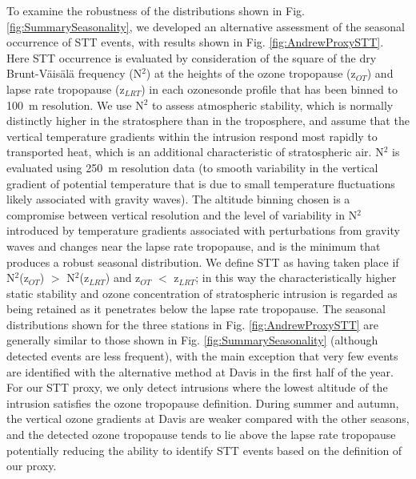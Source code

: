 \documentclass[acp, manuscript]{copernicus} %
\begin{document}
  To examine the robustness of the distributions shown in Fig. \ref{fig:SummarySeasonality}, we developed an alternative assessment of the seasonal occurrence of STT events, with results shown in Fig. \ref{fig:AndrewProxySTT}.
  Here STT occurrence is evaluated by consideration of the square of the dry Brunt-V\"{a}is\"{a}l\"{a} frequency (N$^2$) at the heights of the ozone tropopause (z$_{OT}$) and lapse rate tropopause (z$_{LRT}$) in each ozonesonde profile that has been binned to 100~m resolution.
  We use N$^2$ to assess atmospheric stability, which is normally distinctly higher in the stratosphere than in the troposphere, and assume that the vertical temperature gradients within the intrusion respond most rapidly to transported heat, which is an additional characteristic of stratospheric air.
  N$^2$ is evaluated using 250~m resolution data (to smooth variability in the vertical gradient of potential temperature that is due to small temperature fluctuations likely associated with gravity waves).
  The altitude binning chosen is a compromise between vertical resolution and the level of variability in N$^2$ introduced by temperature gradients associated with perturbations from gravity waves and changes near the lapse rate tropopause, and is the minimum that produces a robust seasonal distribution.
  We define STT as having taken place if N$^2$(z$_{OT}$) $>$ N$^2$(z$_{LRT}$) and z$_{OT}$ $<$ z$_{LRT}$; in this way the characteristically higher static stability and ozone concentration of stratospheric intrusion is regarded as being retained as it penetrates below the lapse rate tropopause. 
  The seasonal distributions shown for the three stations in Fig. \ref{fig:AndrewProxySTT} are generally similar to those shown in Fig. \ref{fig:SummarySeasonality} (although detected events are less frequent), with the main exception that very few events are identified with the alternative method at Davis in the first half of the year.
  For our STT proxy, we only detect intrusions where the lowest altitude of the intrusion satisfies the ozone tropopause definition. During summer and autumn, the vertical ozone gradients at Davis are weaker compared with the other seasons, and the detected ozone tropopause tends to lie above the lapse rate tropopause potentially reducing the ability to identify STT events based on the definition of our proxy.
  
\end{document}
